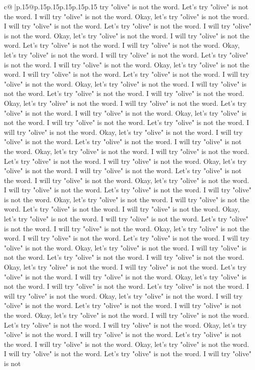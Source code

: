 \documentclass{article}
\begin{document}
{\begin{supertabular}{c@{$\;$}|p{.15\linewidth}@{}p{.15\linewidth}p{.15\linewidth}p{.15\linewidth}p{.15\linewidth}p{.15\linewidth}}
{{{try "olive" is not the word. Let's try "olive" is not the word. I will try "olive" is not the word. Okay, let's try "olive" is not the word. I will try "olive" is not the word. Let's try "olive" is not the word. I will try "olive" is not the word. Okay, let's try "olive" is not the word. I will try "olive" is not the word. Let's try "olive" is not the word. I will try "olive" is not the word. Okay, let's try "olive" is not the word. I will try "olive" is not the word. Let's try "olive" is not the word. I will try "olive" is not the word. Okay, let's try "olive" is not the word. I will try "olive" is not the word. Let's try "olive" is not the word. I will try "olive" is not the word. Okay, let's try "olive" is not the word. I will try "olive" is not the word. Let's try "olive" is not the word. I will try "olive" is not the word. Okay, let's try "olive" is not the word. I will try "olive" is not the word. Let's try "olive" is not the word. I will try "olive" is not the word. Okay, let's try "olive" is not the word. I will try "olive" is not the word. Let's try "olive" is not the word. I will try "olive" is not the word. Okay, let's try "olive" is not the word. I will try "olive" is not the word. Let's try "olive" is not the word. I will try "olive" is not the word. Okay, let's try "olive" is not the word. I will try "olive" is not the word. Let's try "olive" is not the word. I will try "olive" is not the word. Okay, let's try "olive" is not the word. I will try "olive" is not the word. Let's try "olive" is not the word. I will try "olive" is not the word. Okay, let's try "olive" is not the word. I will try "olive" is not the word. Let's try "olive" is not the word. I will try "olive" is not the word. Okay, let's try "olive" is not the word. I will try "olive" is not the word. Let's try "olive" is not the word. I will try "olive" is not the word. Okay, let's try "olive" is not the word. I will try "olive" is not the word. Let's try "olive" is not the word. I will try "olive" is not the word. Okay, let's try "olive" is not the word. I will try "olive" is not the word. Let's try "olive" is not the word. I will try "olive" is not the word. Okay, let's try "olive" is not the word. I will try "olive" is not the word. Let's try "olive" is not the word. I will try "olive" is not the word. Okay, let's try "olive" is not the word. I will try "olive" is not the word. Let's try "olive" is not the word. I will try "olive" is not the word. Okay, let's try "olive" is not the word. I will try "olive" is not the word. Let's try "olive" is not the word. I will try "olive" is not the word. Okay, let's try "olive" is not the word. I will try "olive" is not the word. Let's try "olive" is not the word. I will try "olive" is not the word. Okay, let's try "olive" is not the word. I will try "olive" is not the word. Let's try "olive" is not the word. I will try "olive" is not the word. Okay, let's try "olive" is not the word. I will try "olive" is not the word. Let's try "olive" is not the word. I will try "olive" is not the word. Okay, let's try "olive" is not the word. I will try "olive" is not the word. Let's try "olive" is not the word. I will try "olive" is not }}}
\end{supertabular}}
\end{document}
